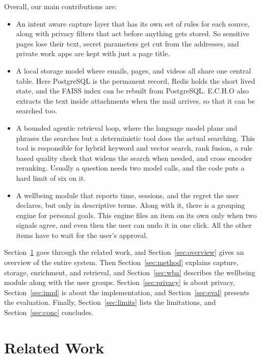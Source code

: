 \documentclass[conference]{IEEEtran}
\begin{document}
Overall, our main contributions are:
\begin{itemize}
\item An intent aware capture layer that has its own set of rules for each source, along with privacy filters that act before anything gets stored. So sensitive pages lose their text, secret parameters get cut from the addresses, and private work apps are kept with just a page title.
\item A local storage model where emails, pages, and videos all share one central table. Here PostgreSQL is the permanent record, Redis holds the short lived state, and the FAISS index can be rebuilt from PostgreSQL. E.C.H.O also extracts the text inside attachments when the mail arrives, so that it can be searched too.
\item A bounded agentic retrieval loop, where the language model plans and phrases the searches but a deterministic tool does the actual searching. This tool is responsible for hybrid keyword and vector search, rank fusion, a rule based quality check that widens the search when needed, and cross encoder reranking. Usually a question needs two model calls, and the code puts a hard limit of six on it.
\item A wellbeing module that reports time, sessions, and the regret the user declares, but only in descriptive terms. Along with it, there is a grouping engine for personal goals. This engine files an item on its own only when two signals agree, and even then the user can undo it in one click. All the other items have to wait for the user's approval.
\end{itemize}

Section~\ref{sec:related} goes through the related work, and Section~\ref{sec:overview} gives an overview of the entire system. Then Section~\ref{sec:method} explains capture, storage, enrichment, and retrieval, and Section~\ref{sec:wba} describes the wellbeing module along with the user groups. Section~\ref{sec:privacy} is about privacy, Section~\ref{sec:impl} is about the implementation, and Section~\ref{sec:eval} presents the evaluation. Finally, Section~\ref{sec:limits} lists the limitations, and Section~\ref{sec:conc} concludes.

\section{Related Work}\label{sec:related}
\end{document}
